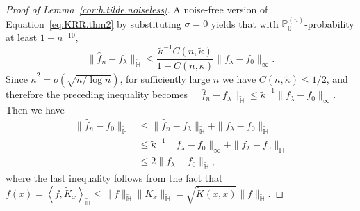 \documentclass[12pt]{article}
\newcommand{\PP}{\mathbb{P}}
\newcommand{\bbH}{\mathbb{H}}
\theoremstyle{plain}
\theoremstyle{nonitalicremark}
\begin{document}
\begin{appendices}
\begin{proof}[Proof of Lemma~\ref{cor:h.tilde.noiseless}]
A noise-free version of Equation~\eqref{eq:KRR.thm2} by substituting $\sigma = 0$  yields that with $\PP_0^{(n)}$-probability at least $1-n^{-10}$,
\begin{equation}
\|\hat{f}_n-f_\lambda\|_{\tilde{\bbH}}\leq \frac{\tilde{\kappa}^{-1}C(n,\tilde{\kappa})}{1-C(n,\tilde{\kappa})}\|f_\lambda-f_0\|_\infty.
\end{equation}
Since $\tilde{\kappa}^2=o(\sqrt{n/\log n})$, for sufficiently large $n$ we have $C(n,\tilde{\kappa})\leq 1/2$, and therefore the preceding inequality becomes $\|\hat{f}_n-f_\lambda\|_{\tilde{\bbH}}\leq \tilde{\kappa}^{-1}\|f_\lambda-f_0\|_\infty$. Then we have
\begin{align}
\|\hat{f}_n-f_0\|_{\tilde{\bbH}}&\leq\|\hat{f}_n-f_\lambda\|_{\tilde{\bbH}}+\|f_\lambda-f_0\|_{\tilde{\bbH}}\\
&\leq \tilde{\kappa}^{-1}\|f_\lambda-f_0\|_\infty+\|f_\lambda-f_0\|_{\tilde{\bbH}}\\
&\leq 2\|f_\lambda-f_0\|_{\tilde{\bbH}},
\end{align}
where the last inequality follows from the fact that $f(x)=\left<f,\tilde{K}_{x}\right>_{\tilde{\bbH}}\leq \|f\|_{\tilde{\bbH}} \|K_{x}\|_{\tilde{\bbH}}= \sqrt{\tilde{K}(x,x)}\|f\|_{\tilde{\bbH}}$.
\end{proof}



\end{appendices}
\end{document}

